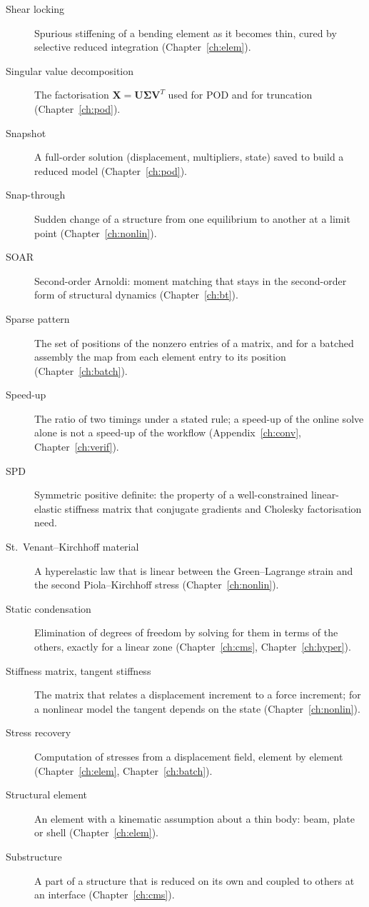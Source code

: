 \begin{description}
\item[Shear locking] Spurious stiffening of a bending element as it becomes thin, cured by selective reduced integration (Chapter~\ref{ch:elem}).
\item[Singular value decomposition] The factorisation $\bm X=\bm U\bm\Sigma\bm V^T$ used for POD and for truncation (Chapter~\ref{ch:pod}).
\item[Snapshot] A full-order solution (displacement, multipliers, state) saved to build a reduced model (Chapter~\ref{ch:pod}).
\item[Snap-through] Sudden change of a structure from one equilibrium to another at a limit point (Chapter~\ref{ch:nonlin}).
\item[SOAR] Second-order Arnoldi: moment matching that stays in the second-order form of structural dynamics (Chapter~\ref{ch:bt}).
\item[Sparse pattern] The set of positions of the nonzero entries of a matrix, and for a batched assembly the map from each element entry to its position (Chapter~\ref{ch:batch}).
\item[Speed-up] The ratio of two timings under a stated rule; a speed-up of the online solve alone is not a speed-up of the workflow (Appendix~\ref{ch:conv}, Chapter~\ref{ch:verif}).
\item[SPD] Symmetric positive definite: the property of a well-constrained linear-elastic stiffness matrix that conjugate gradients and Cholesky factorisation need.
\item[St.~Venant--Kirchhoff material] A hyperelastic law that is linear between the Green--Lagrange strain and the second Piola--Kirchhoff stress (Chapter~\ref{ch:nonlin}).
\item[Static condensation] Elimination of degrees of freedom by solving for them in terms of the others, exactly for a linear zone (Chapter~\ref{ch:cms}, Chapter~\ref{ch:hyper}).
\item[Stiffness matrix, tangent stiffness] The matrix that relates a displacement increment to a force increment; for a nonlinear model the tangent depends on the state (Chapter~\ref{ch:nonlin}).
\item[Stress recovery] Computation of stresses from a displacement field, element by element (Chapter~\ref{ch:elem}, Chapter~\ref{ch:batch}).
\item[Structural element] An element with a kinematic assumption about a thin body: beam, plate or shell (Chapter~\ref{ch:elem}).
\item[Substructure] A part of a structure that is reduced on its own and coupled to others at an interface (Chapter~\ref{ch:cms}).

\end{description}
